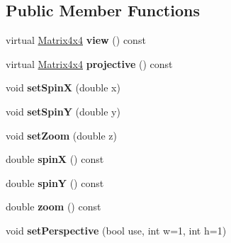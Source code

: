 \subsection*{Public Member Functions}
\begin{DoxyCompactItemize}
\item 
\hypertarget{class_tempest_1_1_camera_a44bd29c078f3f6d4fb56376a37211779}{virtual \hyperlink{class_tempest_1_1_matrix4x4}{Matrix4x4} {\bfseries view} () const }\label{class_tempest_1_1_camera_a44bd29c078f3f6d4fb56376a37211779}

\item 
\hypertarget{class_tempest_1_1_camera_af4815c6e3aa3d8de701e327c7ef8a9fd}{virtual \hyperlink{class_tempest_1_1_matrix4x4}{Matrix4x4} {\bfseries projective} () const }\label{class_tempest_1_1_camera_af4815c6e3aa3d8de701e327c7ef8a9fd}

\item 
\hypertarget{class_tempest_1_1_camera_a13e7a9058a07ae04ea016aabd0c4e693}{void {\bfseries set\+Spin\+X} (double x)}\label{class_tempest_1_1_camera_a13e7a9058a07ae04ea016aabd0c4e693}

\item 
\hypertarget{class_tempest_1_1_camera_a99739f91e38080e596a4aeca647dfe0b}{void {\bfseries set\+Spin\+Y} (double y)}\label{class_tempest_1_1_camera_a99739f91e38080e596a4aeca647dfe0b}

\item 
\hypertarget{class_tempest_1_1_camera_a322e3844448868a906cc0d62c68b0e28}{void {\bfseries set\+Zoom} (double z)}\label{class_tempest_1_1_camera_a322e3844448868a906cc0d62c68b0e28}

\item 
\hypertarget{class_tempest_1_1_camera_ab2a1ff22c62a3b7a222b4aa8672fbdfa}{double {\bfseries spin\+X} () const }\label{class_tempest_1_1_camera_ab2a1ff22c62a3b7a222b4aa8672fbdfa}

\item 
\hypertarget{class_tempest_1_1_camera_a448242b8a3f973e65aaa45644f15bc23}{double {\bfseries spin\+Y} () const }\label{class_tempest_1_1_camera_a448242b8a3f973e65aaa45644f15bc23}

\item 
\hypertarget{class_tempest_1_1_camera_a302899186cd76704ee37552716c9f4b5}{double {\bfseries zoom} () const }\label{class_tempest_1_1_camera_a302899186cd76704ee37552716c9f4b5}

\item 
\hypertarget{class_tempest_1_1_camera_a76837413bfb55455f0673b297bd6faf2}{void {\bfseries set\+Perspective} (bool use, int w=1, int h=1)}\label{class_tempest_1_1_camera_a76837413bfb55455f0673b297bd6faf2}


\end{DoxyCompactItemize}
